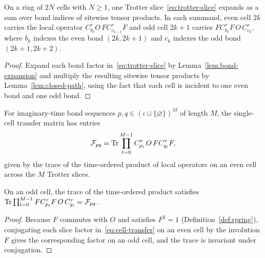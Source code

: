 \begin{lemma}
  \label{lem:slice-sum}
  \leanok
  On a ring of \(2N\) cells with \(N \ge 1\), one Trotter slice~\eqref{eq:trotter-slice} expands as
  a sum over bond indices of sitewise tensor products. In each summand, even cell \(2k\) carries the
  local operator \(C^\tau_{b_k} O\, F C^\tau_{c_{k-1}} F\) and odd cell \(2k+1\) carries
  \(F C^\tau_{b_k} F\, O\, C^\tau_{c_k}\), where \(b_k\) indexes the even bond \((2k, 2k+1)\) and
  \(c_k\) indexes the odd bond \((2k+1, 2k+2)\).
\end{lemma}
\begin{proof}
  \leanok
  Expand each bond factor in~\eqref{eq:trotter-slice} by Lemma~\ref{lem:bond-expansion} and multiply
  the resulting sitewise tensor products by Lemma~\ref{lem:closed-path}, using the fact that each
  cell is incident to one even bond and one odd bond.
\end{proof}

\begin{definition}
  \label{def:cell-transfer}
  \leanok
  For imaginary-time bond sequences \(p, q \in (\iota \sqcup \{\varnothing\})^M\) of length \(M\),
  the single-cell transfer matrix has entries
  \begin{equation}
    \label{eq:cell-transfer}
    \mathcal F_{pq} = \operatorname{Tr} \prod_{t=0}^{M-1} C^\tau_{p_t}\, O\, F C^\tau_{q_t} F,
  \end{equation}
  given by the trace of the time-ordered product of local operators on an even cell across the
  \(M\) Trotter slices.
\end{definition}

\begin{lemma}
  \label{lem:odd-word}
  \leanok
  On an odd cell, the trace of the time-ordered product satisfies
  \(\operatorname{Tr} \prod_{t=0}^{M-1} F C^\tau_{p_t} F\, O\, C^\tau_{q_t} = \mathcal F_{pq}\).
\end{lemma}
\begin{proof}
  \leanok
  Because \(F\) commutes with \(O\) and satisfies \(F^2 = 1\) (Definition~\ref{def:rpring}),
  conjugating each slice factor in~\eqref{eq:cell-transfer} on an even cell by the involution \(F\)
  gives the corresponding factor on an odd cell, and the trace is invariant under conjugation.
\end{proof}

